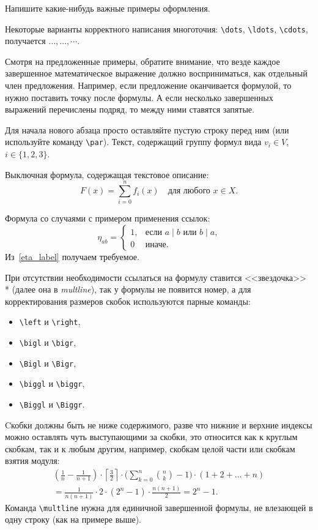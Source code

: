 \begin{task}{0}
Напишите какие-нибудь важные примеры оформления.
\end{task}

\begin{solution}
Некоторые варианты корректного написания многоточия: \verb'\dots', \verb'\ldots', \verb'\cdots', получается $\dots, \ldots, \cdots$. 

Смотря на предложенные примеры, обратите внимание, что везде каждое завершенное математическое выражение должно восприниматься, как отдельный член предложения. Например, если предложение оканчивается формулой, то нужно поставить точку после формулы. А если несколько завершенных выражений перечислены подряд, то между ними ставятся запятые. 

Для начала нового абзаца просто оставляйте пустую строку перед ним (или используйте команду \verb'\par'). Текст, содержащий группу формул вида $v_i\in V$, $i\in\{1,2,3\}$. 

Выключная формула, содержащая текстовое описание: 
\[F(x)=\sum_{i=0}^{n} f_i(x) \quad \text{для любого $x\in{X}$.}\]

Формула со случаями с примером применения ссылок:
\begin{equation} \label{eta_label}
\eta_{ab}=
\begin{cases}
	1, & \text{если $a\mathrel{|} b$ или $b\mathrel{|} a$,} \\
	0 & \text{иначе}.
\end{cases}
\end{equation}
Из~\eqref{eta_label} получаем требуемое.
\end{solution}

При отсутствии необходимости ссылаться на формулу ставится <<звездочка>> * (далее она в \emph{multline}), так у формулы не появится номер, а для корректирования размеров скобок используются парные команды: 
\begin{itemize} 
\item \verb'\left' и \verb'\right', 
\item \verb'\bigl' и \verb'\bigr', 
\item \verb'\Bigl' и \verb'\Bigr', 
\item \verb'\biggl' и \verb'\biggr', 
\item \verb'\Biggl' и \verb'\Biggr'.
\end{itemize} Cкобки должны быть не ниже содержимого, разве что нижние и верхние индексы можно оставлять чуть выступающими за скобки, это относится как к круглым скобкам, так и к любым другим, например, скобкам целой части или скобкам взятия модуля:
\begin{multline*}
   \left(\frac{1}{n}-\frac{1}{n+1}\right)\cdot\left\lceil\frac{3}{2}\right\rceil\cdot\biggl(\sum_{k=0}^n \binom{n}{k}-1\biggr)\cdot (1+2+\ldots+n) \\ = \frac{1}{n(n+1)}\cdot 2\cdot(2^n-1)\cdot \frac{n(n+1)}{2} = 2^n-1.
\end{multline*}
Команда  \verb'\multline' нужна для единичной завершенной формулы, не влезающей в одну строку (как на примере выше).

